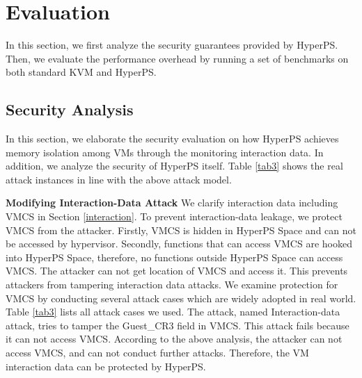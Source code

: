 \section{Evaluation}\label{sec:evaluation}
In this section, we first analyze the security guarantees provided by HyperPS. Then, we evaluate the performance overhead by running a set of benchmarks on both standard KVM and HyperPS.



\subsection{Security Analysis}
 
In this section, we elaborate the security evaluation on how HyperPS achieves memory isolation among VMs through the monitoring interaction data. 
In addition, we analyze the security of HyperPS itself. Table \ref{tab3} shows the real attack instances in line with the above attack model. 



\textbf{Modifying Interaction-Data Attack}
We clarify interaction data including VMCS in Section \ref{interaction}.
 To prevent interaction-data leakage, we protect VMCS from the attacker. Firstly, VMCS is hidden in HyperPS Space and can not be accessed by hypervisor. Secondly, functions that can access VMCS are hooked into HyperPS Space, therefore, no functions outside HyperPS Space can access VMCS. The attacker can not get location of VMCS and access it. This prevents attackers from tampering interaction data attacks. We examine protection for VMCS by conducting several attack cases which are widely adopted in real world. Table \ref{tab3} lists all attack cases we used. The attack, named Interaction-data attack, tries to tamper the Guest\_CR3 field in VMCS. This attack fails because it can not access VMCS. 
  According to the above analysis, the attacker can not access VMCS, and can not conduct further attacks. Therefore, the VM interaction data can be protected by HyperPS.


